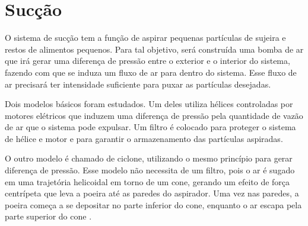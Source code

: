 \section{Sucção} %
\label{sub:aspirador}
	
	O sistema de sucção tem a função de aspirar pequenas partículas de sujeira e restos de alimentos pequenos. Para tal objetivo, será construída uma bomba de ar que irá gerar uma diferença de pressão entre o exterior e o interior do sistema, fazendo com que se induza um fluxo de ar para dentro do sistema. Esse fluxo de ar precisará ter intensidade suficiente para puxar as partículas desejadas. 

	Dois modelos básicos foram estudados. Um deles utiliza hélices controladas por motores elétricos que induzem uma diferença de pressão pela quantidade de vazão de ar que o sistema pode expulsar.  Um filtro é colocado para proteger o sistema de hélice e motor e para garantir o armazenamento das partículas aspiradas.

	O outro modelo é chamado de ciclone, utilizando o mesmo princípio para gerar diferença de pressão. Esse modelo não necessita de um filtro, pois o ar é sugado em uma trajetória helicoidal em torno de um cone, gerando um efeito de força centrípeta que leva a poeira até as paredes do aspirador. Uma vez nas paredes, a poeira começa a se depositar no parte inferior do cone, enquanto o ar escapa pela parte superior do cone \cite{layton}.

